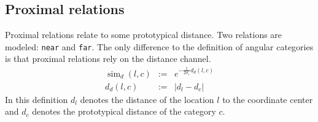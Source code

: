 \subsection{Proximal relations} 
Proximal relations relate to some prototypical
distance. Two relations are modeled: {\footnotesize\tt near} and 
{\footnotesize\tt far}. The only difference to the definition of angular
categories is that proximal relations rely on the distance channel.
\begin{eqnarray}
\label{e:proximal-category-similarity}
\operatorname{sim}_{d}(l,c)&:=&e^{-\frac{1}{2 \sigma_c} d_d(l,c)}\\
\label{e:proximal-distance}
d_d(l,c)&:=&|d_l-d_c|
\end{eqnarray}
In this definition $d_l$ denotes the distance of the location $l$ 
to the coordinate center and $d_c$ denotes the prototypical 
distance of the category $c$.


